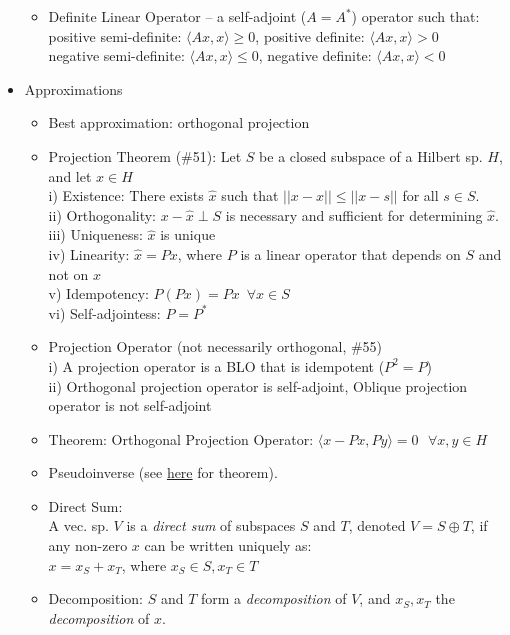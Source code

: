 \documentclass{article}
\newcommand{\la}{\langle}
\newcommand{\ra}{\rangle}
\begin{document}
\begin{itemize}
\begin{itemize}
	\item Definite Linear Operator -- a self-adjoint ($A=A^{*}$) operator such that: \\
	{\footnotesize \color{gray}
	positive semi-definite: $\la Ax, x \ra \ge 0$, positive definite: $\la Ax, x \ra > 0$ \\
	negative semi-definite: $\la Ax, x \ra \le 0$, negative definite: $\la Ax, x \ra < 0$
	}
	\end{itemize}
	\item Approximations
	\begin{itemize}
		\item Best approximation: orthogonal projection
		\item Projection Theorem (\#51): Let $S$ be a closed subspace of a Hilbert sp. $H$, and let $x \in H$ \\
		{\footnotesize \color{gray}
			i) Existence: There exists $\hat{x}$ such that $||x-\hat{x}||\le ||x-s||$ for all $s \in S$.	\\
			ii) Orthogonality: $x-\hat{x}\perp S$ is necessary and sufficient for determining $\hat{x}$.\\
			iii) Uniqueness: $\hat{x}$ is unique\\
			iv) Linearity: 	$\hat{x}=Px$, where $P$ is a linear operator that depends on $S$ and not on $x$\\
			v) Idempotency: $P(Px)=Px\,\,\,\forall x \in S$ \\
			vi) Self-adjointess: $P=P^{*}$
		}
	\item Projection Operator (not necessarily orthogonal, \#55) \\
	{\footnotesize \color{gray}
	i) A projection operator is a BLO that is idempotent ($P^2=P$) \\
	ii) Orthogonal projection operator is self-adjoint,  Oblique projection operator is not self-adjoint
	}
	\item Theorem: Orthogonal Projection Operator: $\la x-Px, Py\ra = 0\,\,\,\, \forall x,y\in H$
	\item Pseudoinverse (see \hyperref[pseudoinv]{here} for theorem).
	\item Direct Sum: \\
	{\footnotesize\color{gray}A vec. sp. $V$ is a \textit{direct sum} of subspaces $S$ and $T$, denoted $V=S\oplus T$, if any non-zero $x$ can be written uniquely as: \\
	$x=x_S+x_T$, where $x_S\in S, x_T\in T$
	}
	\item Decomposition: $S$ and $T$ form a \textit{decomposition} of $V$, and $x_S,x_T$ the \textit{decomposition} of $x$.

\end{itemize}
\end{itemize}
\end{document}
